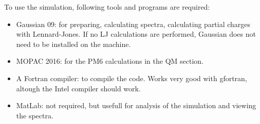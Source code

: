 To use the simulation, following tools and programs are required:
\begin{itemize}
	\item Gaussian 09: for preparing, calculating spectra, calculating partial 
	charges with Lennard-Jones. If no LJ calculations are performed, Gaussian 
	does not need to be installed on the machine.
	\item MOPAC 2016: for the PM6 calculations in the QM section.
	\item A Fortran compiler: to compile the code. Works very good with 
	gfortran, altough the Intel compiler should work.
	\item MatLab: not required, but usefull for analysis of the simulation and 
	viewing the spectra.
\end{itemize}